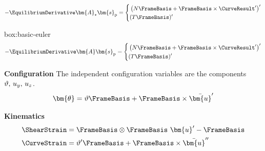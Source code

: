 \begin{equation*}
-\EquilibriumDerivative\bm{A}_* \bm{s}_{\mathrm{p}} = \left\{
\begin{aligned}
 & \left(N\FrameBasis  + \FrameBasis \times\CurveResult^{\prime}\right)^{\prime} \\
 & (T\FrameBasis )^{\prime}
\end{aligned}
\right.
\end{equation*}

\begin{ambox}{box:basic-euler}
$$
-\EquilibriumDerivative\bm{A}\bm{s}_{\mathrm{p}} = \left\{
\begin{aligned}
 & \left(N\FrameBasis  + \FrameBasis \times\CurveResult^{\prime}\right)^{\prime} \\
 & (T\FrameBasis )^{\prime}
\end{aligned}
\right.
$$

\textbf{Configuration}
The independent configuration variables are the components \(\vartheta,\, u_{y},\, u_{z}\).
\begin{equation*}
\bm{\theta} = \vartheta \FrameBasis  + \FrameBasis \times \bar{\bm{u}}^{\prime}
\end{equation*}

\textbf{Kinematics}
\begin{equation*}
\begin{aligned}
\ShearStrain &= \FrameBasis \otimes\FrameBasis  ~ \bm{u}^{\prime} - \FrameBasis  \\
\CurveStrain &= \vartheta^{\prime} \FrameBasis  + \FrameBasis \times\bar{\bm{u}}^{\prime\prime}
\end{aligned}
\end{equation*}

\end{ambox}
